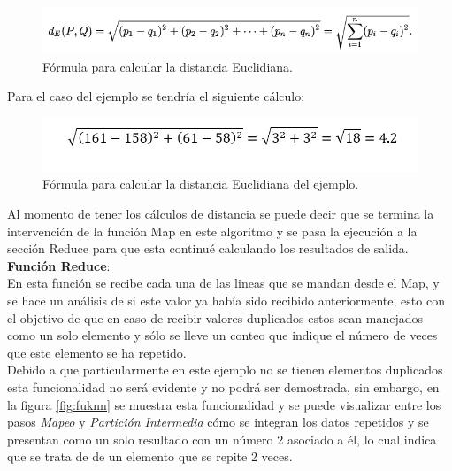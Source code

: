	\begin{figure}[H]
		\begin{center}
			\hypertarget{fig:distanciaEuclidiana}{\hspace{1pt}}
			\includegraphics{capitulo2/images/distanciaEuclidiana.png}
			\caption{Fórmula para calcular la distancia Euclidiana.}
			\label{fig:distanciaEuclidiana2}
		\end{center}
	\end{figure} 
Para el caso del ejemplo se tendría el siguiente cálculo:
	\begin{figure}[H]
		\begin{center}
			\hypertarget{fig:distanciaejemplo}{\hspace{1pt}}
			\includegraphics[width=.7\textwidth]{capitulo4a/images/distanciaejemplo.jpeg}
			\caption{Fórmula para calcular la distancia Euclidiana del ejemplo.}
			\label{fig:distanciaejemplo}
		\end{center}
	\end{figure}
Al momento de tener los cálculos de distancia se puede decir que se termina la intervención de la función Map en este algoritmo y se pasa la ejecución a la sección Reduce para que esta continué calculando los resultados de salida.
\\
\textbf{Función Reduce}: 
\\En esta función se recibe cada una de las lineas que se mandan desde el Map, y se hace un análisis de si este valor ya había sido recibido anteriormente, esto con el objetivo de que en caso de recibir valores duplicados estos sean manejados como un solo elemento y sólo se lleve un conteo que indique el número de veces que este elemento se ha repetido.
\\
Debido a que particularmente en este ejemplo no se tienen elementos duplicados esta funcionalidad no será evidente y no podrá ser demostrada, sin embargo, en la figura \ref{fig:fuknn} se muestra esta funcionalidad y se puede visualizar entre los pasos \emph{Mapeo} y \emph{Partición Intermedia} cómo se integran los datos repetidos y se presentan como un solo resultado con un número 2 asociado a él, lo cual indica que se trata de de un elemento que se repite 2 veces. 

